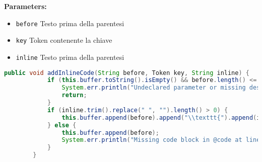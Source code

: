 \textbf{Parameters:}
\begin{itemize}
  \item\texttt{before} Testo prima della parentesi 
  \item\texttt{key} Token contenente la chiave 
  \item\texttt{inline} Testo prima della parentesi  
\end{itemize}

\begin{lstlisting}[language=Java]
        public void addInlineCode(String before, Token key, String inline) {
            if (this.buffer.toString().isEmpty() && before.length() <= 1)  {
                System.err.println("Undeclared parameter or missing description at line " + key.getLine() + " before the inline code.");
                return;
            }
            if (inline.trim().replace(" ", "").length() > 0) {
                this.buffer.append(before).append("\\texttt{").append(inline).append("}");
            } else {
                this.buffer.append(before);
                System.err.println("Missing code block in @code at line " + key.getLine());
            }
        }
\end{lstlisting}
